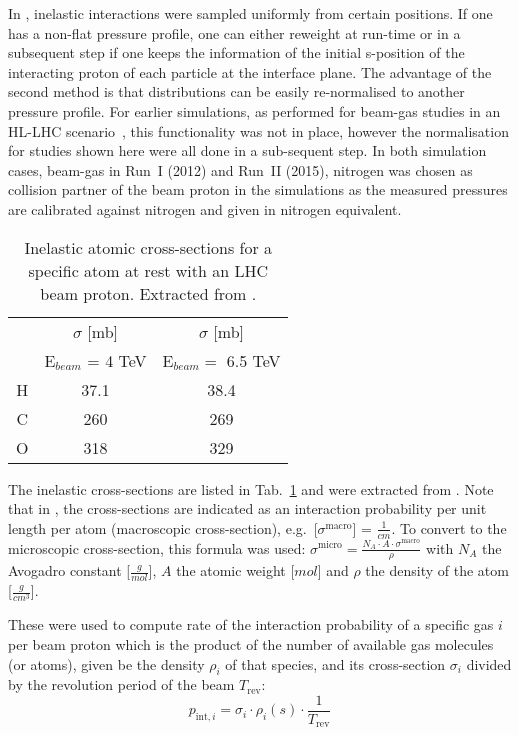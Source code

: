 In \fluka, inelastic interactions were sampled uniformly from certain positions. If one has a non-flat pressure profile, one can either reweight at run-time or in a subsequent step if one keeps the information of the initial s-position of the interacting proton of each particle at the interface plane. The advantage of the second method is that distributions can be easily re-normalised to another pressure profile. For earlier simulations, as performed for beam-gas studies in an HL-LHC scenario~\cite{kweeIpac14}, this functionality was not in place, however the normalisation for studies shown here were all done in a sub-sequent step. In both simulation cases, beam-gas in Run~I (2012) and Run~II (2015), nitrogen was chosen as collision partner of the beam proton in the simulations as the measured pressures are calibrated against nitrogen and given in nitrogen equivalent.

\begin{table}
   \centering
   \caption{Inelastic atomic cross-sections for a specific atom at rest with an LHC beam proton. Extracted from \fluka.}
   \begin{tabular}{c|c|c}\hline
     &  $\sigma$ [mb] &  $\sigma$ [mb] \\
       & E$_{beam}$ = 4 TeV   & E$_{beam} =$ 6.5 TeV \\ \hline\hline
       H & 37.1 & 38.4 \\
       C & 260& 269 \\
       O & 318 & 329 \\
       \hline
   \end{tabular}
   \label{tab:atomicXsections}
\end{table}

The inelastic cross-sections are listed in Tab.~\ref{tab:atomicXsections} and were extracted from \fluka. Note that in \fluka, the cross-sections are indicated as an interaction probability per unit length per atom (macroscopic cross-section), e.g.~[$\sigma^{\textrm{macro}}$] = $\frac{1}{cm}$. To convert to the microscopic cross-section, this formula was used: $\sigma^{\textrm{micro}} = \frac{N_A \cdot A \cdot \sigma^{\textrm{macro}}}{\rho}$ with $N_A$ the Avogadro constant [$\frac{g}{mol}$], $A$ the atomic weight [$mol$] and $\rho$ the density of the atom [$\frac{g}{cm^3}$].

These were used to compute rate of the interaction probability of a specific gas $i$ per beam proton which is the product of the number of available gas molecules (or atoms), given be the density $\rho_i$ of that species, and its cross-section $\sigma_i$ divided by the revolution period of the beam $T_{\mathrm{rev}}$:
\begin{equation} \label{eq2}
p_{\mathrm{int},i} = \sigma_{i} \cdot \rho_{i}(s) \cdot \frac{1}{T_{\mathrm{rev}}}
\end{equation}

